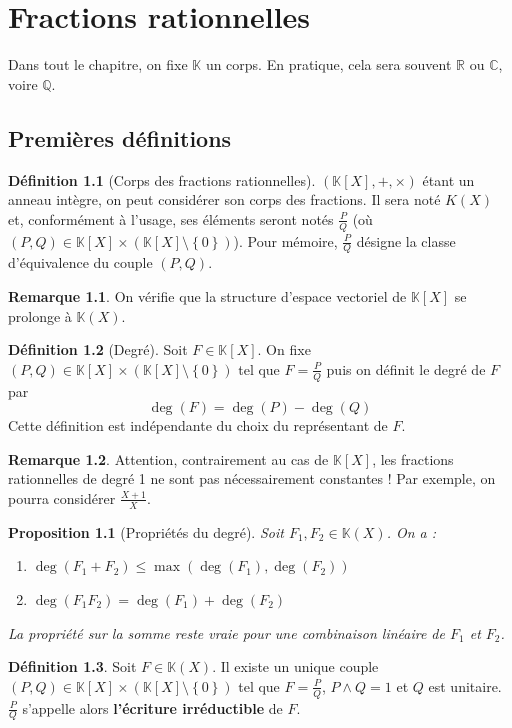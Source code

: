 \documentclass[french]{book}
\newcommand{\Q}{\mathbb{Q}}
\newcommand{\R}{\mathbb{R}}
\newcommand{\C}{\mathbb{C}}
\newcommand{\K}{\mathbb{K}}
\theoremstyle{plain}
\newtheorem{prop}{Proposition}[chapter]
\theoremstyle{definition}
\newtheorem{dfn}{Définition}[chapter]
\newtheorem{rmq}{Remarque}[chapter]
\theoremstyle{remark}
\begin{document}
\newpage
\chapter{Fractions rationnelles}
Dans tout le chapitre, on fixe $\K$ un corps. En pratique, cela sera souvent $\R$ ou $\C$, voire $\Q$.
\section{Premières définitions}
\begin{dfn}[Corps des fractions rationnelles]
	$(\K[X],+,\times)$ étant un anneau intègre, on peut considérer son corps des fractions. Il sera noté $K(X)$ et, conformément à l'usage, ses éléments seront notés $\displaystyle \frac{P}{Q}$ (où $(P,Q)\in\K[X]\times(\K[X]\setminus\left\{0\right\})$). Pour mémoire, $\displaystyle \frac{P}{Q}$ désigne la classe d'équivalence du couple $(P,Q)$.
\end{dfn}
\begin{rmq} On vérifie que la structure d'espace vectoriel de $\K[X]$ se prolonge à $\K(X)$. \end{rmq}
\begin{dfn}[Degré]
	Soit $F\in\K[X]$. On fixe $(P,Q)\in\K[X]\times(\K[X]\setminus\left\{0\right\})$ tel que $\displaystyle F=\frac{P}{Q}$ puis on définit le degré de $F$ par $$\deg(F)=\deg(P)-\deg(Q)$$ Cette définition est indépendante du choix du représentant de $F$.
\end{dfn}
\begin{rmq} Attention, contrairement au cas de $\K[X]$, les fractions rationnelles de degré 1 ne sont pas nécessairement constantes ! Par exemple, on pourra considérer $\displaystyle \frac{X+1}{X}$. \end{rmq}
\begin{prop}[Propriétés du degré]
	Soit $F_1,F_2\in\K(X)$. On a :
	\begin{enumerate}
		\item $\deg(F_1+F_2)\leqslant\max(\deg(F_1),\deg(F_2))$
		\item $\deg(F_1F_2)=\deg(F_1)+\deg(F_2)$
	\end{enumerate}
	La propriété sur la somme reste vraie pour une combinaison linéaire de $F_1$ et $F_2$.
\end{prop}
\begin{dfn}
	Soit $F\in\K(X)$. Il existe un unique couple $(P,Q)\in\K[X]\times(\K[X]\setminus\left\{0\right\})$ tel que $\displaystyle F=\frac{P}{Q}$, $P\wedge Q=1$ et $Q$ est unitaire. $\displaystyle \frac{P}{Q}$ s'appelle alors \textbf{l'écriture irréductible} de $F$.
\end{dfn}
\end{document}
